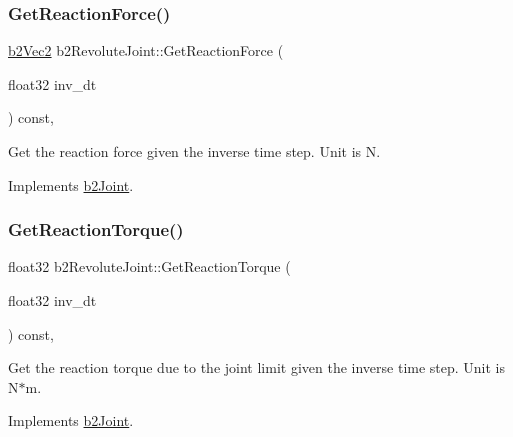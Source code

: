 \subsubsection{\texorpdfstring{Get\+Reaction\+Force()}{GetReactionForce()}\hspace{0.1cm}{\footnotesize\ttfamily [2/2]}}
{\footnotesize\ttfamily \hyperlink{structb2Vec2}{b2\+Vec2} b2\+Revolute\+Joint\+::\+Get\+Reaction\+Force (\begin{DoxyParamCaption}\item[{float32}]{inv\+\_\+dt }\end{DoxyParamCaption}) const\hspace{0.3cm}{\ttfamily [override]}, {\ttfamily [virtual]}}

Get the reaction force given the inverse time step. Unit is N. 

Implements \hyperlink{classb2Joint_a7e0eddefb9b69ad050b8ef6425838a74}{b2\+Joint}.

\mbox{\label{classb2RevoluteJoint_aab61a3f330aa93ae28f657e36bc3db51}} 
\subsubsection{\texorpdfstring{Get\+Reaction\+Torque()}{GetReactionTorque()}\hspace{0.1cm}{\footnotesize\ttfamily [1/2]}}
{\footnotesize\ttfamily float32 b2\+Revolute\+Joint\+::\+Get\+Reaction\+Torque (\begin{DoxyParamCaption}\item[{float32}]{inv\+\_\+dt }\end{DoxyParamCaption}) const\hspace{0.3cm}{\ttfamily [override]}, {\ttfamily [virtual]}}

Get the reaction torque due to the joint limit given the inverse time step. Unit is N$\ast$m. 

Implements \hyperlink{classb2Joint_ae355e441c2aa842777dc04e24f15ced0}{b2\+Joint}.

\mbox{\label{classb2RevoluteJoint_af068e495214c92316d02130ba0a568b7}} 

